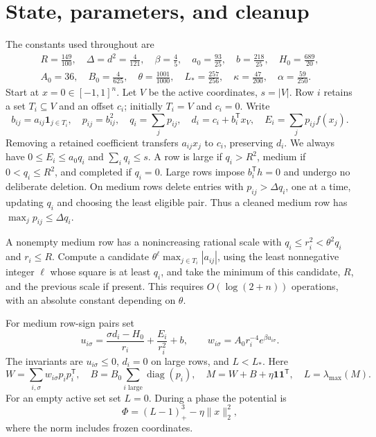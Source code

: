 \documentclass[11pt]{amsart}
\theoremstyle{remark}\newtheorem{remark}[theorem]{Remark}
\newcommand{\diag}{\operatorname{diag}}
\newcommand{\one}{\mathbf 1}
\newcommand{\T}{\mathsf T}
\begin{document}
\section{State, parameters, and cleanup}\label{sec:state}

The constants used throughout are
\begin{equation}\label{eq:parameters}
\begin{gathered}
 R=\frac{149}{100},\quad \Delta=d^2=\frac4{121},\quad
 \beta=\frac45,\quad a_0=\frac{93}{25},\quad b=\frac{218}{25},\quad
 H_0=\frac{689}{20},\\
 A_0=36,\quad B_0=\frac4{625},\quad
 \theta=\frac{1001}{1000},\quad L_* =\frac{257}{256},\quad
 \kappa=\frac{47}{200},\quad \alpha=\frac{59}{250}.
\end{gathered}
\end{equation}
Start at $x=0\in[-1,1]^n$. Let $V$ be the active coordinates, $s=|V|$.
Row $i$ retains a set $T_i\subseteq V$ and an offset $c_i$; initially
$T_i=V$ and $c_i=0$. Write
\[
 b_{ij}=a_{ij}\one_{j\in T_i},\quad p_{ij}=b_{ij}^2,\quad
 q_i=\sum_jp_{ij},\quad d_i=c_i+b_i^\T x_V,\quad
 E_i=\sum_jp_{ij}f(x_j).
\]
Removing a retained coefficient transfers $a_{ij}x_j$ to $c_i$, preserving
$d_i$. We always have $0\le E_i\le a_0q_i$ and $\sum_iq_i\le s$.
A row is large if $q_i>R^2$, medium if $0<q_i\le R^2$, and completed if
$q_i=0$. Large rows impose $b_i^\T h=0$ and undergo no deliberate deletion.
On medium rows delete entries with $p_{ij}>\Delta q_i$, one at a time,
updating $q_i$ and choosing the least eligible pair. Thus a cleaned medium
row has $\max_jp_{ij}\le\Delta q_i$.

A nonempty medium row has a nonincreasing rational scale with
$q_i\le r_i^2<\theta^2q_i$ and $r_i\le R$. Compute a candidate
$\theta^\ell\max_{j\in T_i}|a_{ij}|$, using the least nonnegative integer
$\ell$ whose square is at least $q_i$, and take the minimum of this
candidate, $R$, and the previous scale if present. This requires
$O(\log(2+n))$ operations, with an absolute constant depending on $\theta$.

For medium row-sign pairs set
\begin{equation}\label{eq:barrier}
 u_{i\sigma}=\frac{\sigma d_i-H_0}{r_i}+\frac{E_i}{r_i^2}+b,
 \qquad w_{i\sigma}=A_0r_i^{-4}e^{\beta u_{i\sigma}}.
\end{equation}
The invariants are $u_{i\sigma}\le0$, $d_i=0$ on large rows, and
$L<L_*$. Here
\begin{equation}\label{eq:matrix}
 W=\sum_{i,\sigma}w_{i\sigma}p_ip_i^\T,\quad
 B=B_0\sum_{i\text{ large}}\diag(p_i),\quad
 M=W+B+\eta\one\one^\T,\quad L=\lambda_{\max}(M).
\end{equation}
For an empty active set set $L=0$. During a phase the potential is
\[
 \Phi=(L-1)_+^3-\eta\|x\|_2^2,
\]
where the norm includes frozen coordinates.
\end{document}

